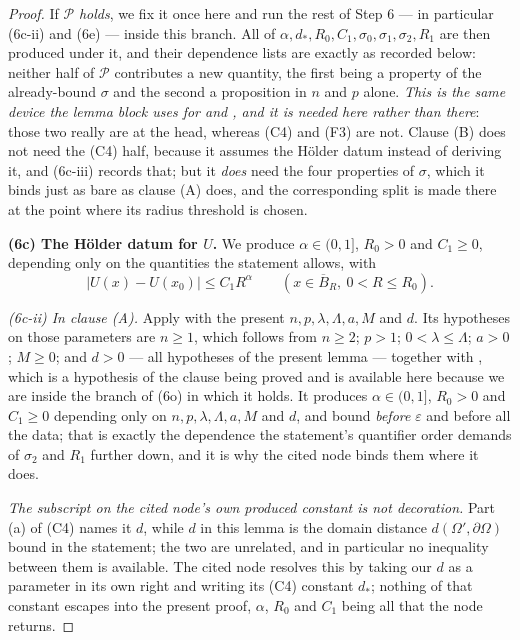 \begin{proof}
If $\mathcal P$ \emph{holds}, we fix it once here and run the rest of Step 6 ---
in particular (6c-ii) and (6e) --- inside this branch.  All of
$\alpha,d_\ast,R_0,C_1,\sigma_0,\sigma_1,\sigma_2,R_1$ are then produced under
it, and their dependence lists are exactly as recorded below: neither half of
$\mathcal P$ contributes a new quantity, the first being a property of the
already-bound $\sigma$ and the second a proposition in $n$ and $p$ alone.
\emph{This is the same device the lemma block uses for
 and , and it is
needed here rather than there}: those two really are at the head, whereas (C4)
and (F3) are not.  Clause (B) does not need the (C4) half, because it assumes
the H\"older datum instead of deriving it, and (6c-iii) records that; but it
\emph{does} need the four properties of $\sigma$, which it binds just as bare as
clause (A) does, and the corresponding split is made there at the point where
its radius threshold is chosen.

\textbf{(6c) The H\"older datum for $U$.}  We produce $\alpha\in(0,1]$, $R_0>0$
and $C_1\ge0$, depending only on the quantities the statement allows, with
\[
|U(x)-U(x_0)|\le C_1R^{\alpha}\qquad(x\in\overline B_R,\ 0<R\le R_0).
\tag{6.3}
\]

\emph{(6c-ii) In clause \textup{(A)}.}  Apply
 with the present
$n,p,\lambda,\Lambda,a,M$ and $d$.  Its hypotheses on those parameters are
$n\ge1$, which follows from $n\ge2$; $p>1$; $0<\lambda\le\Lambda$; $a>0$;
$M\ge0$; and $d>0$ --- all hypotheses of the present lemma --- together with
, which is a hypothesis of the clause
being proved and is available here because we are inside the branch of (6o) in
which it holds.  It produces $\alpha\in(0,1]$, $R_0>0$ and $C_1\ge0$ depending
only on $n,p,\lambda,\Lambda,a,M$ and $d$, and bound \emph{before}
$\varepsilon$ and before all the data; that is exactly the dependence the
statement's quantifier order demands of $\sigma_2$ and $R_1$ further down, and
it is why the cited node binds them where it does.

\emph{The subscript on the cited node's own produced constant is not
decoration.}  Part (a) of (C4) names it $d$, while $d$ in this lemma is the
domain distance $d(\Omega',\partial\Omega)$ bound in the statement; the two are
unrelated, and in particular no inequality between them is available.  The
cited node resolves this by taking our $d$ as a parameter in its own right and
writing its (C4) constant $d_\ast$; nothing of that constant escapes into the
present proof, $\alpha$, $R_0$ and $C_1$ being all that the node returns.


\end{proof}
